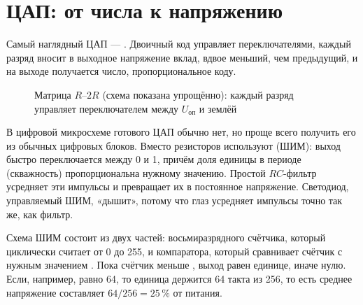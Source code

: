 \section{ЦАП: от числа к напряжению}

Самый наглядный ЦАП --- . Двоичный
код управляет переключателями, каждый разряд вносит в выходное напряжение вклад,
вдвое меньший, чем предыдущий, и на выходе получается число, пропорциональное
коду.

\begin{figure}[H]
\centering
{}
\caption{Матрица $R$--$2R$ (схема показана упрощённо): каждый разряд управляет переключателем между $U_{\text{оп}}$ и землёй}
\end{figure}

В цифровой микросхеме готового ЦАП обычно нет, но проще всего получить его
из обычных цифровых блоков. Вместо резисторов используют
 (ШИМ): выход быстро переключается между 0
и 1, причём доля единицы в периоде (скважность) пропорциональна нужному
значению. Простой $RC$-фильтр усредняет эти импульсы и превращает их в
постоянное напряжение. Светодиод, управляемый ШИМ, «дышит», потому что глаз
усредняет импульсы точно так же, как фильтр.

Схема ШИМ состоит из двух частей: восьмиразрядного счётчика, который
циклически считает от 0 до 255, и компаратора, который сравнивает счётчик с
нужным значением . Пока счётчик меньше , выход равен
единице, иначе нулю. Если, например,  равно 64, то единица держится
64 такта из 256, то есть среднее напряжение составляет $64/256 = 25\,\%$ от
питания.

